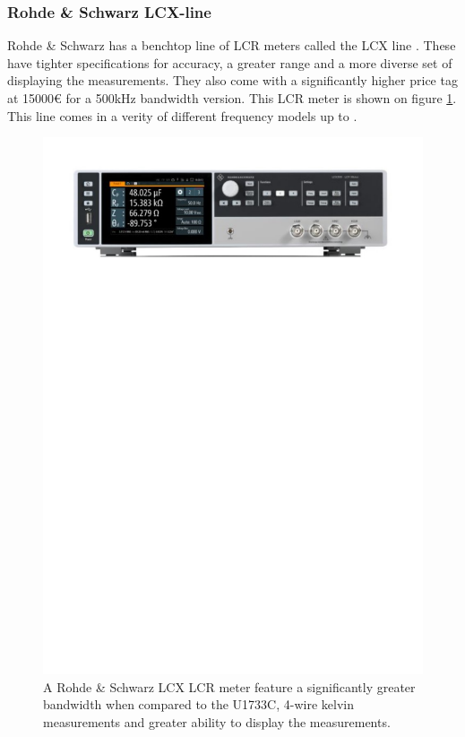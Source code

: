 \subsubsection*{Rohde \& Schwarz LCX-line}
Rohde \& Schwarz has a benchtop line of LCR meters called the LCX line \cite{RSLCXLCRMeters}. These have tighter specifications for accuracy, a greater range and a more diverse set of displaying the measurements. They also come with a significantly higher price tag at 15000€ for a 500kHz bandwidth version. This LCR meter is shown on figure \ref{fig:2_2_RSLCX}. This line comes in a verity of different frequency models up to .
\begin{figure}[H]
    \centering
    \includegraphics[clip, trim=0 630 0 50, width=1\textwidth]{Sections/2_ProblemAnalysis/FIgures/RSLCXLCR.pdf}
    \caption{A Rohde \& Schwarz LCX LCR meter feature a significantly greater bandwidth when compared to the U1733C, 4-wire kelvin measurements and greater ability to display the measurements.\cite{RSLCXLCRMeters}}
    \label{fig:2_2_RSLCX}
\end{figure}

